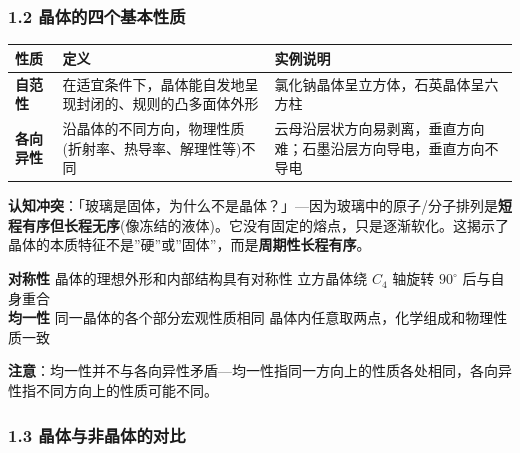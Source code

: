 \subsubsection{1.2 晶体的四个基本性质}\label{ux6676ux4f53ux7684ux56dbux4e2aux57faux672cux6027ux8d28}

{\def\LTcaptype{none} %
\begin{longtable}[]{@{}
  >{\raggedright\arraybackslash}p{}
  >{\raggedright\arraybackslash}p{}
  >{\raggedright\arraybackslash}p{}@{}}
\toprule\noalign{}
\begin{minipage}[b]{\linewidth}\raggedright
性质
\end{minipage} & \begin{minipage}[b]{\linewidth}\raggedright
定义
\end{minipage} & \begin{minipage}[b]{\linewidth}\raggedright
实例说明
\end{minipage} \\
\midrule\noalign{}
\endhead
\bottomrule\noalign{}
\endlastfoot
\textbf{自范性} & 在适宜条件下，晶体能自发地呈现封闭的、规则的凸多面体外形 & 氯化钠晶体呈立方体，石英晶体呈六方柱 \\
\textbf{各向异性} & 沿晶体的不同方向，物理性质(折射率、热导率、解理性等)不同 & 云母沿层状方向易剥离，垂直方向难；石墨沿层方向导电，垂直方向不导电 \\
\end{longtable}
}

\textbf{认知冲突}：「玻璃是固体，为什么不是晶体？」---因为玻璃中的原子/分子排列是\textbf{短程有序但长程无序}(像冻结的液体)。它没有固定的熔点，只是逐渐软化。这揭示了晶体的本质特征不是''硬''或''固体''，而是\textbf{周期性长程有序}。

\textbf{对称性} \textbar{} 晶体的理想外形和内部结构具有对称性 \textbar{} 立方晶体绕 \(C_4\) 轴旋转 \(90^\circ\) 后与自身重合 \textbar{}\\
\textbf{均一性} \textbar{} 同一晶体的各个部分宏观性质相同 \textbar{} 晶体内任意取两点，化学组成和物理性质一致 \textbar{}

\textbf{注意}：均一性并不与各向异性矛盾---均一性指同一方向上的性质各处相同，各向异性指不同方向上的性质可能不同。

\subsubsection{1.3 晶体与非晶体的对比}\label{ux6676ux4f53ux4e0eux975eux6676ux4f53ux7684ux5bf9ux6bd4}

